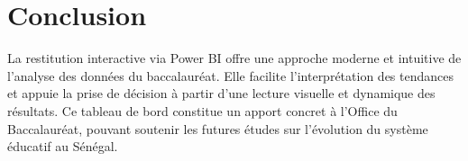 \section{Conclusion}

La restitution interactive via Power BI offre une approche moderne et intuitive de l’analyse des données du baccalauréat. 
Elle facilite l’interprétation des tendances et appuie la prise de décision à partir d’une lecture visuelle et dynamique des résultats. 
Ce tableau de bord constitue un apport concret à l’Office du Baccalauréat, pouvant soutenir les futures études sur l’évolution du système éducatif au Sénégal.